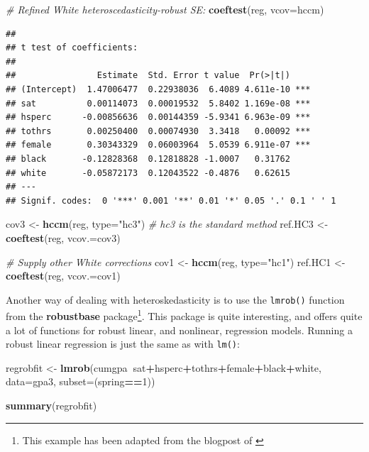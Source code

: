 \documentclass[]{book}
\newenvironment{Shaded}{\begin{snugshade}}{\end{snugshade}}
\newcommand{\CommentTok}[1]{\textcolor[rgb]{0.56,0.35,0.01}{\textit{#1}}}
\newcommand{\DataTypeTok}[1]{\textcolor[rgb]{0.13,0.29,0.53}{#1}}
\newcommand{\DecValTok}[1]{\textcolor[rgb]{0.00,0.00,0.81}{#1}}
\newcommand{\KeywordTok}[1]{\textcolor[rgb]{0.13,0.29,0.53}{\textbf{#1}}}
\newcommand{\NormalTok}[1]{#1}
\newcommand{\OperatorTok}[1]{\textcolor[rgb]{0.81,0.36,0.00}{\textbf{#1}}}
\newcommand{\StringTok}[1]{\textcolor[rgb]{0.31,0.60,0.02}{#1}}
\let\rmarkdownfootnote\footnote%
\def\footnote{\protect\rmarkdownfootnote}
\begin{document}
\begin{Shaded}
\begin{Highlighting}[]
\CommentTok{# Refined White heteroscedasticity-robust SE:}
\KeywordTok{coeftest}\NormalTok{(reg, }\DataTypeTok{vcov=}\NormalTok{hccm)}
\end{Highlighting}
\end{Shaded}

\begin{verbatim}
## 
## t test of coefficients:
## 
##                Estimate  Std. Error t value  Pr(>|t|)    
## (Intercept)  1.47006477  0.22938036  6.4089 4.611e-10 ***
## sat          0.00114073  0.00019532  5.8402 1.169e-08 ***
## hsperc      -0.00856636  0.00144359 -5.9341 6.963e-09 ***
## tothrs       0.00250400  0.00074930  3.3418   0.00092 ***
## female       0.30343329  0.06003964  5.0539 6.911e-07 ***
## black       -0.12828368  0.12818828 -1.0007   0.31762    
## white       -0.05872173  0.12043522 -0.4876   0.62615    
## ---
## Signif. codes:  0 '***' 0.001 '**' 0.01 '*' 0.05 '.' 0.1 ' ' 1
\end{verbatim}

\begin{Shaded}
\begin{Highlighting}[]
\NormalTok{cov3 <-}\StringTok{ }\KeywordTok{hccm}\NormalTok{(reg, }\DataTypeTok{type=}\StringTok{"hc3"}\NormalTok{) }\CommentTok{# hc3 is the standard method}
\NormalTok{ref.HC3 <-}\StringTok{ }\KeywordTok{coeftest}\NormalTok{(reg, }\DataTypeTok{vcov.=}\NormalTok{cov3)}

\CommentTok{# Supply other White corrections}
\NormalTok{cov1 <-}\StringTok{ }\KeywordTok{hccm}\NormalTok{(reg, }\DataTypeTok{type=}\StringTok{"hc1"}\NormalTok{)}
\NormalTok{ref.HC1 <-}\StringTok{ }\KeywordTok{coeftest}\NormalTok{(reg, }\DataTypeTok{vcov.=}\NormalTok{cov1)}
\end{Highlighting}
\end{Shaded}

Another way of dealing with heteroskedasticity is to use the
\texttt{lmrob()} function from the \textbf{robustbase} package\footnote{This
  example has been adapted from the blogpost of \citet{Rodrigues}}. This
package is quite interesting, and offers quite a lot of functions for
robust linear, and nonlinear, regression models. Running a robust linear
regression is just the same as with \texttt{lm()}:

\begin{Shaded}
\begin{Highlighting}[]
\NormalTok{regrobfit <-}\StringTok{ }\KeywordTok{lmrob}\NormalTok{(cumgpa}\OperatorTok{~}\NormalTok{sat}\OperatorTok{+}\NormalTok{hsperc}\OperatorTok{+}\NormalTok{tothrs}\OperatorTok{+}\NormalTok{female}\OperatorTok{+}\NormalTok{black}\OperatorTok{+}\NormalTok{white, }
                   \DataTypeTok{data=}\NormalTok{gpa3, }\DataTypeTok{subset=}\NormalTok{(spring}\OperatorTok{==}\DecValTok{1}\NormalTok{))}

\KeywordTok{summary}\NormalTok{(regrobfit)}
\end{Highlighting}
\end{Shaded}
\end{document}
